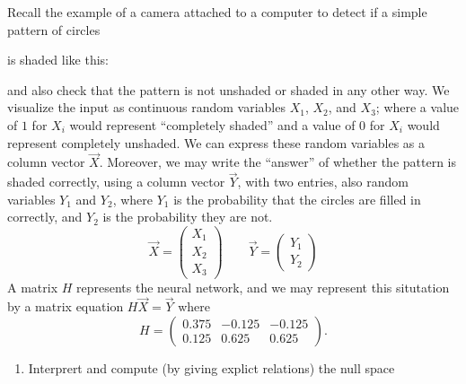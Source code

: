 \documentclass{ximera}
\begin{document}
\begin{example}
  Recall the example of a camera attached to a computer to detect if
  a simple pattern of circles
  \begin{center}
  \end{center}
  is shaded like this:
  \begin{center}
  \end{center}
  and also check that the pattern is not unshaded or shaded in any
  other way. We visualize the input as continuous
  random variables $X_1$, $X_2$, and $X_3$; where a value of $1$ for
  $X_i$ would represent ``completely shaded'' and a value of $0$ for
  $X_i$ would represent completely unshaded. We can express these random
  variables as a column vector $\vec{X}$. Moreover, we may write the
  ``answer'' of whether the pattern is shaded correctly, using a column
  vector $\vec{Y}$, with two entries, also random variables $Y_1$ and
  $Y_2$, where $Y_1$ is the probability that the circles are filled in
  correctly, and $Y_2$ is the probability they are not.
  \[
    \vec{X} = \begin{pmatrix} X_1 \\ X_2 \\ X_3 \end{pmatrix} \qquad \vec{Y} =
    \begin{pmatrix} Y_1 \\ Y_2 \end{pmatrix}
  \]
  A matrix $H$ represents the neural network, and we may represent this
  situtation by a matrix equation $H\vec{X} = \vec{Y}$ where
  \[
    H = \begin{pmatrix}
      0.375 & -0.125 & -0.125 \\
      0.125 & 0.625  & 0.625
    \end{pmatrix}.
  \]
  \begin{enumerate}
    \item Interprert and compute (by giving explict relations) the null space

\end{enumerate}
\end{example}
\end{document}
